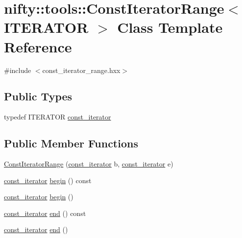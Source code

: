 \hypertarget{classnifty_1_1tools_1_1ConstIteratorRange}{}\section{nifty\+:\+:tools\+:\+:Const\+Iterator\+Range$<$ I\+T\+E\+R\+A\+T\+OR $>$ Class Template Reference}
\label{classnifty_1_1tools_1_1ConstIteratorRange}


{\ttfamily \#include $<$const\+\_\+iterator\+\_\+range.\+hxx$>$}

\subsection*{Public Types}
\begin{DoxyCompactItemize}
\item 
typedef I\+T\+E\+R\+A\+T\+OR \hyperlink{classnifty_1_1tools_1_1ConstIteratorRange_afb02141878a935f32f828810a2be648b}{const\+\_\+iterator}
\end{DoxyCompactItemize}
\subsection*{Public Member Functions}
\begin{DoxyCompactItemize}
\item 
\hyperlink{classnifty_1_1tools_1_1ConstIteratorRange_a004be230f5b9612f6890e4cceed0ce92}{Const\+Iterator\+Range} (\hyperlink{classnifty_1_1tools_1_1ConstIteratorRange_afb02141878a935f32f828810a2be648b}{const\+\_\+iterator} b, \hyperlink{classnifty_1_1tools_1_1ConstIteratorRange_afb02141878a935f32f828810a2be648b}{const\+\_\+iterator} e)
\item 
\hyperlink{classnifty_1_1tools_1_1ConstIteratorRange_afb02141878a935f32f828810a2be648b}{const\+\_\+iterator} \hyperlink{classnifty_1_1tools_1_1ConstIteratorRange_a76df7605834d379def3fa7d265a193d8}{begin} () const
\item 
\hyperlink{classnifty_1_1tools_1_1ConstIteratorRange_afb02141878a935f32f828810a2be648b}{const\+\_\+iterator} \hyperlink{classnifty_1_1tools_1_1ConstIteratorRange_a58df2f679ea04772b59d8a29401b7fb9}{begin} ()
\item 
\hyperlink{classnifty_1_1tools_1_1ConstIteratorRange_afb02141878a935f32f828810a2be648b}{const\+\_\+iterator} \hyperlink{classnifty_1_1tools_1_1ConstIteratorRange_a1e840d8c32a5eca80b8852ff28af68cc}{end} () const
\item 
\hyperlink{classnifty_1_1tools_1_1ConstIteratorRange_afb02141878a935f32f828810a2be648b}{const\+\_\+iterator} \hyperlink{classnifty_1_1tools_1_1ConstIteratorRange_add87b395b12e7ab2724c5ed61f04163f}{end} ()
\end{DoxyCompactItemize}


